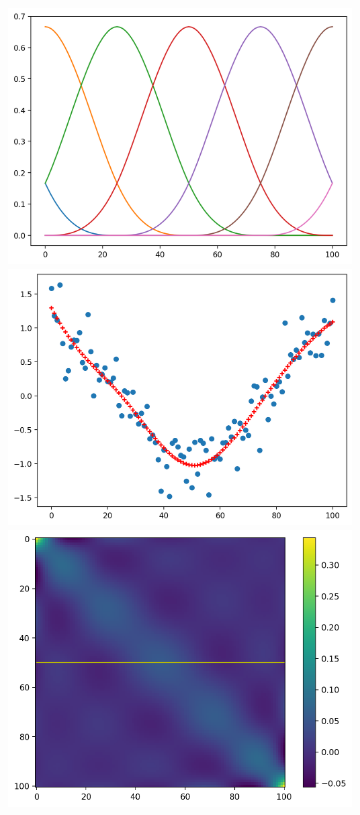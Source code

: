 \documentclass[10pt,twoside]{book}
\begin{document}
\begin{figure}
\begin{subfigure}{0.32\textwidth}
     \includegraphics[width=\textwidth]{smoothing_M7_gamma0_basisFunctions}
     \includegraphics[width=\textwidth]{smoothing_M7_gamma0_fitted}
     \includegraphics[width=\textwidth]{smoothing_M7_gamma0_smoothingMatrix}

\end{subfigure}
\end{figure}
\end{document}
